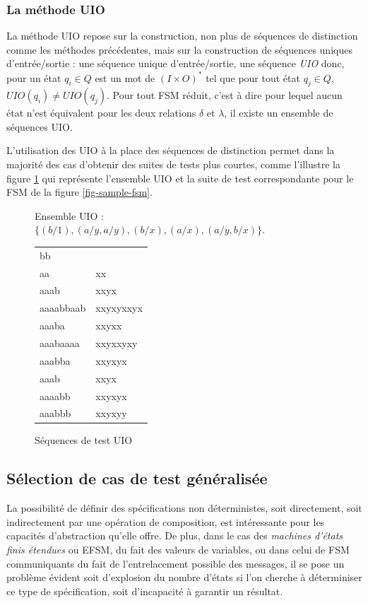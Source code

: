 \subsubsection{La m\'ethode \textsf{UIO}}
\label{sec:la-methode-uio}

La m\'ethode \textsf{UIO} repose sur la construction, non plus de
s\'equences de distinction comme les m\'ethodes pr\'ec\'edentes,
mais sur la construction de s\'equences uniques d'entr\'ee/sortie : 
une s\'equence unique d'entr\'ee/sortie, une s\'equence \emph{UIO}
donc, pour un \'etat $q_i \in Q$ est un mot de
$(I\times{}O)^*$ tel que pour tout \'etat 
$q_j \in Q$, $UIO(q_i)\neq UIO(q_j)$. Pour tout \textsf{FSM} r\'eduit, c'est
\`a dire pour lequel aucun \'etat n'est \'equivalent pour les deux
relations $\delta$ et $\lambda$, il existe un ensemble de s\'equences
UIO.

L'utilisation des UIO \`a la place des s\'equences de distinction
permet dans la majorit\'e des cas d'obtenir des suites de tests plus
courtes, comme l'illustre la figure \ref{fig-seq-test-uio} qui
repr\'esente l'ensemble \textsf{UIO} et la suite de test
correspondante pour le \textsf{FSM}  de la figure \ref{fig-sample-fsm}.

\begin{figure}[htbp]
Ensemble \textsf{UIO} : $\{(b/1), (a/y, a/y), (b/x), (a/x), (a/y, b/x) \}$.

\begin{tabular}{|ll|}
\hline
bb &  \\
aa & xx \\
aaab & xxyx \\
aaaabbaab & xxyxyxxyx \\
aaaba & xxyxx \\
aaabaaaa & xxyxxyxy \\
aaabba & xxyxyx \\
aaab & xxyx \\
aaaabb & xxyxyx \\
aaabbb & xxyxyy \\
\hline
\end{tabular}
\caption{S\'equences de test UIO}
\label{fig-seq-test-uio}
\end{figure}

\subsection{S\'election de cas de test g\'en\'eralis\'ee}
\label{sec:selection-de-cas}
La possibilit\'e de d\'efinir des
sp\'ecifications non d\'eterministes, soit directement, soit
indirectement par une op\'eration de composition, est int\'eressante
pour les capacit\'es d'abstraction qu'elle offre. De plus, dans
le cas des \emph{machines d'\'etats finis \'etendues} ou \textsf{EFSM}\cite{bourhfir-automatic}, du fait des valeurs de
variables, ou dans celui de 
\textsf{FSM}\cite{luo-test-sel-cfsm} communiquants du fait de
l'entrelacement possible des messages, il  se pose un
probl\`eme \'evident soit d'explosion du nombre d'\'etats si l'on
cherche \`a d\'eterminiser ce type de sp\'ecification, soit
d'incapacit\'e \`a garantir un r\'esultat. 

